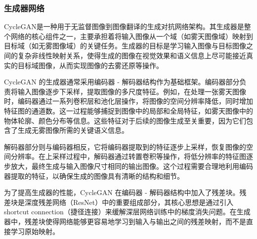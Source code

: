 \subsubsection{生成器网络}


CycleGAN是一种用于无监督图像到图像翻译的生成对抗网络架构。其生成器是整个网络的核心组件之一，主要承担着将输入图像从一个域（如雾天图像域）映射到目标域（如无雾图像域）的关键任务。生成器的目标是学习输入图像与目标图像之间的复杂非线性映射关系，使得生成的图像在视觉效果和语义信息上尽可能接近真实的目标域图像，从而实现图像的去雾还原等操作。

CycleGAN 的生成器通常采用编码器 - 解码器结构作为基础框架。编码器部分负责将输入图像逐步下采样，提取图像的多尺度特征。例如，在处理一张雾天图像时，编码器通过一系列卷积层和池化层操作，将图像的空间分辨率降低，同时增加特征图的通道数。这一过程能够捕捉到图像中的局部和全局特征，如雾天图像中的物体轮廓、颜色分布等信息。这些特征对于后续的图像生成至关重要，因为它们包含了生成无雾图像所需的关键语义信息。

解码器部分则与编码器相反，它将编码器提取到的特征逐步上采样，恢复图像的空间分辨率。在上采样过程中，解码器通过转置卷积等操作，将低分辨率的特征图逐步放大，最终生成与输入图像尺寸相同的输出图像。这个过程需要合理地利用编码器提取的特征，以确保生成的图像具有清晰的结构和细节。

\begin{figure}[htb]
    \centering
    \captionsetup{font=footnotesize}
    \label{fig:gnet}
\end{figure}


为了提高生成器的性能，CycleGAN 在编码器 - 解码器结构中加入了残差块。残差块是深度残差网络（ResNet）中的重要组成部分，其核心思想是通过引入 shortcut connection（捷径连接）来缓解深层网络训练中的梯度消失问题。在生成器中，残差块使得网络能够更容易地学习到输入与输出之间的残差映射，而不是直接学习原始映射。

